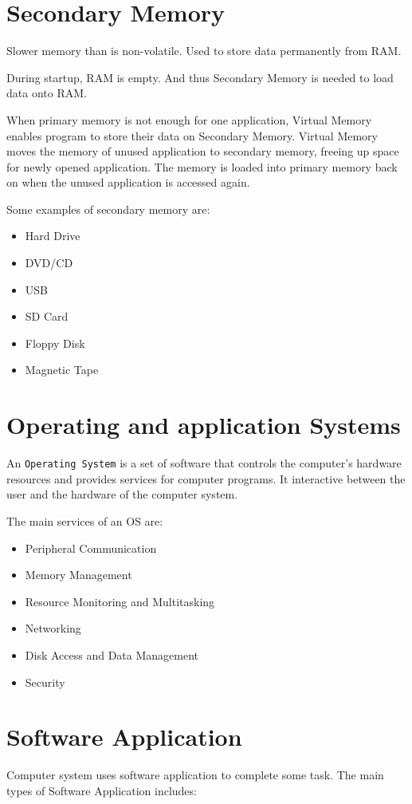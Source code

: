 \documentclass[../notes.tex]{subfiles}
\begin{document}
\section{Secondary Memory}
Slower memory than is non-volatile.
Used to store data permanently from RAM.

During startup, RAM is empty. 
And thus Secondary Memory is needed to load data onto RAM.

When primary memory is not enough for one application, Virtual Memory enables program to store their data on Secondary Memory.
Virtual Memory moves the memory of unused application to secondary memory, freeing up space for newly opened application.
The memory is loaded into primary memory back on when the unused application is accessed again.

Some examples of secondary memory are:
\begin{itemize}
	\item Hard Drive
	\item DVD/CD
	\item USB
	\item SD Card
	\item Floppy Disk
	\item Magnetic Tape
\end{itemize}

\section{Operating and application Systems}
An \texttt{Operating System} is a set of software that controls the computer's hardware resources and provides services for computer programs.
It interactive between the user and the hardware of the computer system.

The main services of an OS are:
\begin{itemize}
	\item Peripheral Communication
	\item Memory Management
	\item Resource Monitoring and Multitasking
	\item Networking
	\item Disk Access and Data Management
	\item Security
\end{itemize}

\section{Software Application}
Computer system uses software application to complete some task.
The main types of Software Application includes:
\end{document}
